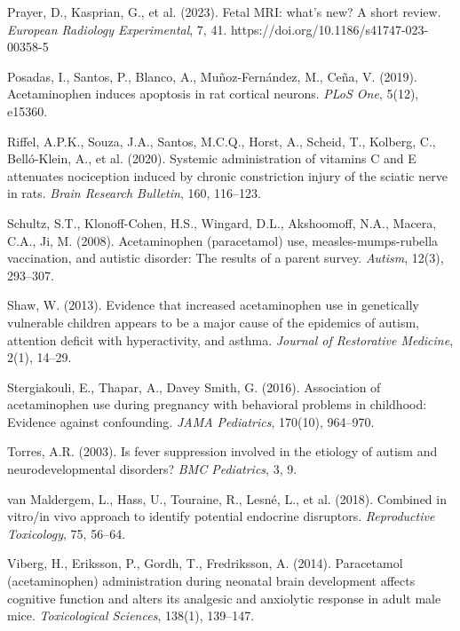 \documentclass[12pt]{article}
\begin{document}
\begin{thebibliography}{99}
Prayer, D., Kasprian, G., et al. (2023).
Fetal MRI: what's new? A short review.
\textit{European Radiology Experimental}, 7, 41.
https://doi.org/10.1186/s41747-023-00358-5

Posadas, I., Santos, P., Blanco, A., Muñoz-Fernández, M., Ceña, V. (2019).
Acetaminophen induces apoptosis in rat cortical neurons.
\textit{PLoS One}, 5(12), e15360.

Riffel, A.P.K., Souza, J.A., Santos, M.C.Q., Horst, A., Scheid, T., Kolberg, C., Belló-Klein, A., et al. (2020).
Systemic administration of vitamins C and E attenuates nociception induced by chronic constriction injury of the sciatic nerve in rats.
\textit{Brain Research Bulletin}, 160, 116--123.

Schultz, S.T., Klonoff-Cohen, H.S., Wingard, D.L., Akshoomoff, N.A., Macera, C.A., Ji, M. (2008).
Acetaminophen (paracetamol) use, measles-mumps-rubella vaccination, and autistic disorder: The results of a parent survey.
\textit{Autism}, 12(3), 293--307.

Shaw, W. (2013).
Evidence that increased acetaminophen use in genetically vulnerable children appears to be a major cause of the epidemics of autism, attention deficit with hyperactivity, and asthma.
\textit{Journal of Restorative Medicine}, 2(1), 14--29.

Stergiakouli, E., Thapar, A., Davey Smith, G. (2016).
Association of acetaminophen use during pregnancy with behavioral problems in childhood: Evidence against confounding.
\textit{JAMA Pediatrics}, 170(10), 964--970.

Torres, A.R. (2003).
Is fever suppression involved in the etiology of autism and neurodevelopmental disorders?
\textit{BMC Pediatrics}, 3, 9.

van Maldergem, L., Hass, U., Touraine, R., Lesné, L., et al. (2018).
Combined in vitro/in vivo approach to identify potential endocrine disruptors.
\textit{Reproductive Toxicology}, 75, 56--64.

Viberg, H., Eriksson, P., Gordh, T., Fredriksson, A. (2014).
Paracetamol (acetaminophen) administration during neonatal brain development affects cognitive function and alters its analgesic and anxiolytic response in adult male mice.
\textit{Toxicological Sciences}, 138(1), 139--147.


\end{thebibliography}
\end{document}

